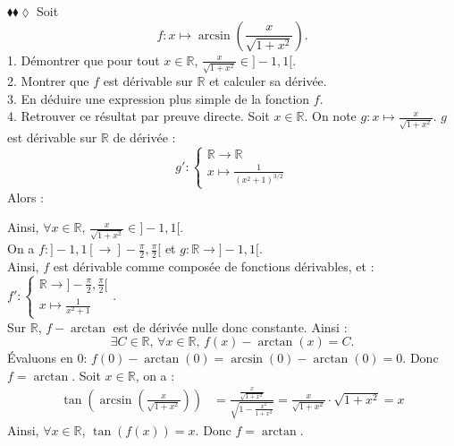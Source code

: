 \documentclass[11pt]{article}
\begin{document}
\begin{exercice}{$\blacklozenge\blacklozenge\lozenge$}{}
    Soit
    \begin{equation*}
        f:x\mapsto\arcsin\left(\frac{x}{\sqrt{1+x^2}}\right).
    \end{equation*}
    1. Démontrer que pour tout $x\in\mathbb{R}$, $\frac{x}{\sqrt{1+x^2}}\in]-1,1[$.\\
    2. Montrer que $f$ est dérivable sur $\mathbb{R}$ et calculer sa dérivée.\\
    3. En déduire une expression plus simple de la fonction $f$.\\
    4. Retrouver ce résultat par preuve directe.
    \tcblower
     Soit $x\in\mathbb{R}$. On note $g:x\mapsto\frac{x}{\sqrt{1+x^2}}$. $g$ est dérivable sur $\mathbb{R}$ de dérivée :
    \begin{equation*}
        g':\begin{cases}\mathbb{R}\rightarrow\mathbb{R}\\x\mapsto\frac{1}{(x^2+1)^{3/2}}\end{cases}
    \end{equation*}
    Alors : 
    \begin{center}
    \end{center}
    Ainsi, $\forall{x\in\mathbb{R}}$, $\frac{x}{\sqrt{1+x^2}}\in]-1,1[$.\\[0.25cm]
     On a $f:]-1,1[\rightarrow]-\frac{\pi}{2},\frac{\pi}{2}[$ et $g:\mathbb{R}\rightarrow]-1,1[$.\\
    Ainsi, $f$ est dérivable comme composée de fonctions dérivables, et : $f':\begin{cases}\mathbb{R}\rightarrow]-\frac{\pi}{2}, \frac{\pi}{2}[\\x\mapsto\frac{1}{x^2+1}\end{cases}$.\\
     Sur $\mathbb{R}$, $f-\arctan$ est de dérivée nulle donc constante. Ainsi :
    \begin{equation*}
        \exists C\in\mathbb{R} \text{, } \forall{x}\in\mathbb{R} \text{, } f(x)-\arctan(x)=C.
    \end{equation*}
    Évaluons en $0$: $f(0)-\arctan(0)=\arcsin(0)-\arctan(0)=0$. Donc $f=\arctan$.\n
     Soit $x\in\mathbb{R}$, on a :
    \begin{align*}
        \tan\left(\arcsin\left(\frac{x}{\sqrt{1+x^2}}\right)\right)&=\frac{\frac{x}{\sqrt{1+x^2}}}{\sqrt{1-\frac{x^2}{1+x^2}}}
        =\frac{x}{\sqrt{1+x^2}}\cdot\sqrt{1+x^2}
        =x
    \end{align*}
    Ainsi, $\forall{x\in\mathbb{R}}$, $\tan(f(x))=x$. Donc $f=\arctan$.
\end{exercice}
\end{document}
